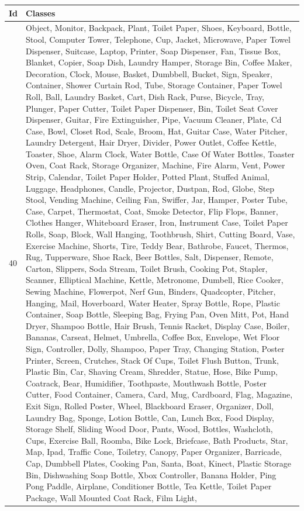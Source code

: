     \begin{table}
    	\begin{center}
    		\begin{tabular}{ | l | p{14cm} |}
    			\hline
    			
    			\cellcolor{purple!30}Id & \cellcolor{purple!30}Classes \\ \hline
    			
    			40 & Object, Monitor, Backpack, Plant, Toilet Paper, Shoes, Keyboard, Bottle, Stool, Computer Tower, Telephone, Cup, Jacket, Microwave, Paper Towel Dispenser, Suitcase, Laptop, Printer, Soap Dispenser, Fan, Tissue Box, Blanket, Copier, Soap Dish, Laundry Hamper, Storage Bin, Coffee Maker, Decoration, Clock, Mouse, Basket, Dumbbell, Bucket, Sign, Speaker, Container, Shower Curtain Rod, Tube, Storage Container, Paper Towel Roll, Ball, Laundry Basket, Cart, Dish Rack, Purse, Bicycle, Tray, Plunger, Paper Cutter, Toilet Paper Dispenser, Bin, Toilet Seat Cover Dispenser, Guitar, Fire Extinguisher, Pipe, Vacuum Cleaner, Plate, Cd Case, Bowl, Closet Rod, Scale, Broom, Hat, Guitar Case, Water Pitcher, Laundry Detergent, Hair Dryer, Divider, Power Outlet, Coffee Kettle, Toaster, Shoe, Alarm Clock, Water Bottle, Case Of Water Bottles, Toaster Oven, Coat Rack, Storage Organizer, Machine, Fire Alarm, Vent, Power Strip, Calendar, Toilet Paper Holder, Potted Plant, Stuffed Animal, Luggage, Headphones, Candle, Projector, Dustpan, Rod, Globe, Step Stool, Vending Machine, Ceiling Fan, Swiffer, Jar, Hamper, Poster Tube, Case, Carpet, Thermostat, Coat, Smoke Detector, Flip Flops, Banner, Clothes Hanger, Whiteboard Eraser, Iron, Instrument Case, Toilet Paper Rolls, Soap, Block, Wall Hanging, Toothbrush, Shirt, Cutting Board, Vase, Exercise Machine, Shorts, Tire, Teddy Bear, Bathrobe, Faucet, Thermos, Rug, Tupperware, Shoe Rack, Beer Bottles, Salt, Dispenser, Remote, Carton, Slippers, Soda Stream, Toilet Brush, Cooking Pot, Stapler, Scanner, Elliptical Machine, Kettle, Metronome, Dumbell, Rice Cooker, Sewing Machine, Flowerpot, Nerf Gun, Binders, Quadcopter, Pitcher, Hanging, Mail, Hoverboard, Water Heater, Spray Bottle, Rope, Plastic Container, Soap Bottle, Sleeping Bag, Frying Pan, Oven Mitt, Pot, Hand Dryer, Shampoo Bottle, Hair Brush, Tennis Racket, Display Case, Boiler, Bananas, Carseat, Helmet, Umbrella, Coffee Box, Envelope, Wet Floor Sign, Controller, Dolly, Shampoo, Paper Tray, Changing Station, Poster Printer, Screen, Crutches, Stack Of Cups, Toilet Flush Button, Trunk, Plastic Bin, Car, Shaving Cream, Shredder, Statue, Hose, Bike Pump, Coatrack, Bear, Humidifier, Toothpaste, Mouthwash Bottle, Poster Cutter, Food Container, Camera, Card, Mug, Cardboard, Flag, Magazine, Exit Sign, Rolled Poster, Wheel, Blackboard Eraser, Organizer, Doll, Laundry Bag, Sponge, Lotion Bottle, Can, Lunch Box, Food Display, Storage Shelf, Sliding Wood Door, Pants, Wood, Bottles, Washcloth, Cups, Exercise Ball, Roomba, Bike Lock, Briefcase, Bath Products, Star, Map, Ipad, Traffic Cone, Toiletry, Canopy, Paper Organizer, Barricade, Cap, Dumbbell Plates, Cooking Pan, Santa, Boat, Kinect, Plastic Storage Bin, Dishwashing Soap Bottle, Xbox Controller, Banana Holder, Ping Pong Paddle, Airplane, Conditioner Bottle, Tea Kettle, Toilet Paper Package, Wall Mounted Coat Rack, Film Light, 
\end{tabular}
\end{center}
\end{table}
